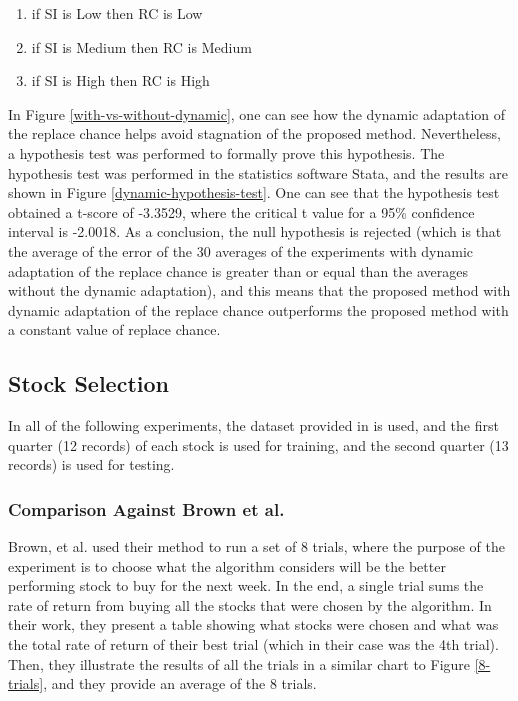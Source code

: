 \documentclass[12pt,journal,compsoc]{IEEEtran}
\begin{document}
\begin{enumerate}
\item if SI is Low then RC is Low
\item if SI is Medium then RC is Medium
\item if SI is High then RC is High
\end{enumerate}

In Figure \ref{with-vs-without-dynamic}, one can see how the dynamic adaptation of the replace chance helps avoid stagnation of the proposed method. Nevertheless, a hypothesis test was performed to formally prove this hypothesis. The hypothesis test was performed in the statistics software Stata, and the results are shown in Figure \ref{dynamic-hypothesis-test}. One can see that the hypothesis test obtained a t-score of -3.3529, where the critical t value for a 95\% confidence interval is -2.0018. As a conclusion, the null hypothesis is rejected (which is that the average of the error of the 30 averages of the experiments with dynamic adaptation of the replace chance is greater than or equal than the averages without the dynamic adaptation), and this means that the proposed method with dynamic adaptation of the replace chance outperforms the proposed method with a constant value of replace chance.

\subsection{Stock Selection}

In all of the following experiments, the dataset provided in \cite{brown2013dynamic} is used, and the first quarter (12 records) of each stock is used for training, and the second quarter (13 records) is used for testing.

\subsubsection{Comparison Against Brown et al.}

Brown, et al. \cite{brown2013dynamic} used their method to run a set of 8 trials, where the purpose of the experiment is to choose what the algorithm considers will be the better performing stock to buy for the next week. In the end, a single trial sums the rate of return from buying all the stocks that were chosen by the algorithm. In their work, they present a table showing what stocks were chosen and what was the total rate of return of their best trial (which in their case was the 4th trial). Then, they illustrate the results of all the trials in a similar chart to Figure \ref{8-trials}, and they provide an average of the 8 trials.
\end{document}
